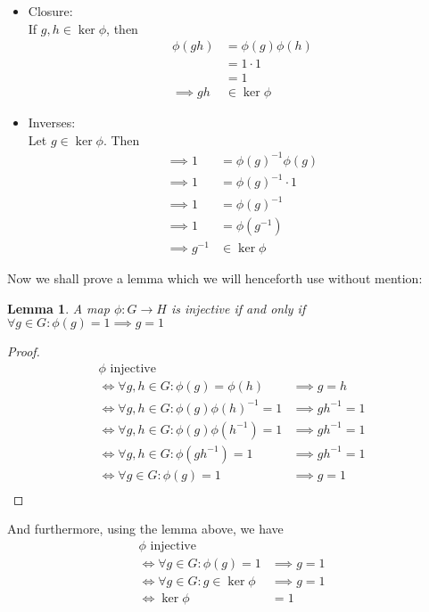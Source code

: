 \documentclass{article}
\newcommand{\inv}[1]{ {#1}^{-1} }
\newtheorem{lemma}[theorem]{Lemma}
\begin{document}
\subsubsection{}\label{ex6p14}
\begin{itemize}
\item Closure:\\
If $g,h \in \ker \phi$, then
\begin{align*}
\phi(gh) &= \phi(g)\phi(h)\\
&= 1\cdot 1\\
&= 1\\
\implies gh &\in \ker\phi
\end{align*}
\item Inverses:\\
Let $g\in\ker\phi$. Then
\begin{align*}
\implies 1 &= \inv{\phi(g)}\phi(g)\\
\implies 1 &= \inv{\phi(g)}\cdot 1\\
\implies 1 &= \inv{\phi(g)}\\
\implies 1 &= \phi(\inv{g})\\
\implies \inv{g} &\in \ker\phi
\end{align*}
\end{itemize}
Now we shall prove a lemma which we will henceforth use without mention:
\begin{lemma}
A map $\phi: G \to H$ is injective if and only if\\
$\forall g \in G: \phi(g) = 1 \implies g =1$
\end{lemma}
\begin{proof}
\begin{align*}
\phi \mbox{ injective }\\
\iff \forall g,h\in G: \phi(g)=\phi(h) &\implies g=h\\
\iff \forall g,h\in G: \phi(g)\inv{\phi(h)}=1 &\implies g\inv{h} = 1\\
\iff \forall g,h\in G: \phi(g)\phi(\inv{h})=1 &\implies g\inv{h} = 1\\
\iff \forall g,h\in G: \phi(g\inv{h})=1 &\implies g\inv{h} = 1\\
\iff \forall g\in G: \phi(g)=1 &\implies g = 1\\
\end{align*}
\end{proof}
And furthermore, using the lemma above, we have
\begin{align*}
\phi \mbox{ injective }\\
\iff \forall g\in G: \phi(g)=1 &\implies g = 1\\
\iff \forall g\in G: g\in\ker\phi &\implies g = 1\\
\iff \ker\phi &= 1
\end{align*}
\end{document}
